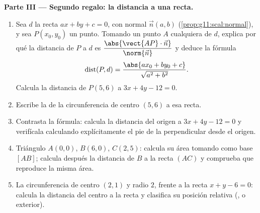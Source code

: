 \begin{problem}
\medskip
\noindent\textbf{Parte III --- Segundo regalo: la distancia a una
recta.}
\begin{enumerate}[resume]
  \item Sea $d$ la recta $ax + by + c = 0$, con  normal
        $\vec n(a, b)$ (\cref{prop:g11:scal:normal}), y sea $P(x_0, y_0)$
        un punto. Tomando un punto $A$ cualquiera de $d$, explica por qué
        la distancia de $P$ a $d$ es
        $\dfrac{\abs{\vect{AP} \cdot \vec n}}{\norm{\vec n}}$ y deduce la
        fórmula
        \[
        \operatorname{dist}(P, d)
        = \frac{\abs{a x_0 + b y_0 + c}}{\sqrt{a^2 + b^2}} .
        \]
        Calcula la distancia de $P(5, 6)$ a $3x + 4y - 12 = 0$.
  \item Escribe la  de la circunferencia de centro $(5, 6)$
         a esa recta.
  \item Contrasta la fórmula: calcula la distancia del origen a
        $3x + 4y - 12 = 0$ y verifícala calculando explícitamente el pie
        de la perpendicular desde el origen.
  \item Triángulo $A(0,0)$, $B(6,0)$, $C(2,5)$: calcula su área tomando
        como base $[AB]$; calcula después la distancia de $B$ a la recta
        $(AC)$ y comprueba que reproduce la misma área.
  \item La circunferencia de centro $(2, 1)$ y radio $2$, frente a la
        recta $x + y - 6 = 0$: calcula la distancia del centro a la recta
        y clasifica su posición relativa (,  o exterior).
\end{enumerate}


\end{problem}
